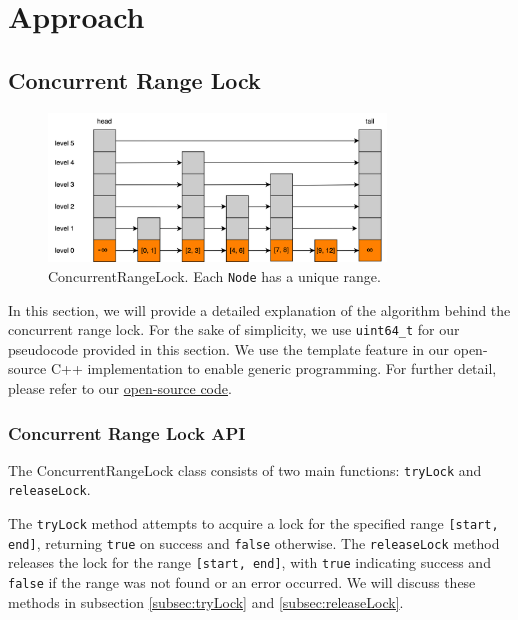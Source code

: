 \chapter{Approach}\label{ch:approach}

\section{Concurrent Range Lock}\label{sec:concurrent-range-lock}

\begin{figure}[h]
    \centering
    \includegraphics[width=0.8\textwidth]{./figures/rangelock.png}
    \caption{ConcurrentRangeLock. Each \texttt{Node} has a unique range.}
    \label{fig:concurrent_range_lock}
\end{figure}

In this section, we will provide a detailed explanation of the algorithm behind the concurrent range lock. For the sake of simplicity, we use \texttt{uint64\_t} for our pseudocode provided in this section. 
We use the template feature in our open-source C++ implementation to enable generic programming. 
For further detail, please refer to our \href{https://github.com/thuaduc/concurrent-range-locking}{open-source code}.

\newpage

\subsection{Concurrent Range Lock API}\label{subsec:api}

The ConcurrentRangeLock class consists of two main functions: \texttt{tryLock} and \texttt{releaseLock}.

The \texttt{tryLock} method attempts to acquire a lock for the specified range \texttt{[start, end]}, returning \texttt{true} on success and \texttt{false} otherwise.
The \texttt{releaseLock} method releases the lock for the range \texttt{[start, end]}, with \texttt{true} indicating success and \texttt{false} if the range was not found or an error occurred.
We will discuss these methods in subsection \ref{subsec:tryLock} and \ref{subsec:releaseLock}.

